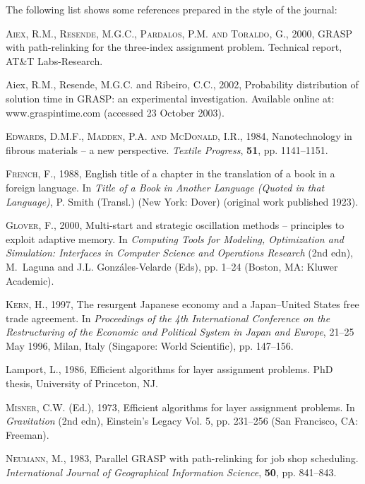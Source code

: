 \documentclass[]{tRSL2e}
\begin{document}
The following list shows some references prepared in the style of the journal:
%
\begin{thebibliography}{9}

\textsc{Aiex, R.M., Resende, M.G.C., Pardalos, P.M. {\normalfont and} Toraldo,
  G.}, 2000, GRASP with path-relinking for the three-index assignment problem.
  Technical report, AT\&T Labs-Research.

A{\sc iex}, R.M., R{\sc esende},  M.G.C. and R{\sc ibeiro}, C.C.,
2002, Probability distribution of solution time in GRASP: an
experimental investigation. Available online at:
www.graspintime.com (accessed 23 October 2003).

\textsc{Edwards, D.M.F., Madden, P.A. {\normalfont and} McDonald, I.R.}, 1984,
Nanotechnology in fibrous materials -- a new perspective. {\itshape Textile Progress}, \textbf{51}, pp. 1141--1151.

\textsc{French, F.}, 1988, English title of a chapter in the translation of a
  book in a foreign language. In     {\itshape Title of a Book in Another Language
  (Quoted in that Language)}, {P.} Smith (Transl.)   (New York: Dover)
  (original work published 1923).

\textsc{Glover, F.}, 2000, Multi-start and strategic oscillation
  methods -- principles to exploit adaptive memory. In {\itshape Computing Tools
  for Modeling, Optimization and Simulation: Interfaces in Computer Science and
  Operations Research} (2nd  edn), M.~Laguna {\normalfont and} J.L.
  Gonz\'{a}les-Velarde (Eds), pp. 1--24  (Boston, MA: Kluwer Academic).

\textsc{Kern, H.}, 1997, The resurgent Japanese economy and a Japan--United
  States free trade agreement. In {\itshape Proceedings of the }{\itshape 4th
  International Conference on the Restructuring of the Economic and Political
  System in Japan and Europe}, 21--25 May 1996, Milan, Italy (Singapore: World
  Scientific), pp. 147--156.

L{\sc amport}, L., 1986, Efficient algorithms for layer assignment
problems. PhD thesis, University of Princeton, NJ.

\textsc{Misner, C.W.} (Ed.), 1973, Efficient algorithms for layer assignment
  problems. In {\itshape Gravitation} (2nd  edn), Einstein's Legacy Vol. 5, pp. 231--256
  (San Francisco, CA: Freeman).

\textsc{Neumann, M.}, 1983, Parallel GRASP with path-relinking for job
  shop scheduling. {\itshape International Journal of Geographical Information
  Science}, \textbf{50}, pp. 841--843.

\end{thebibliography}
\end{document}
